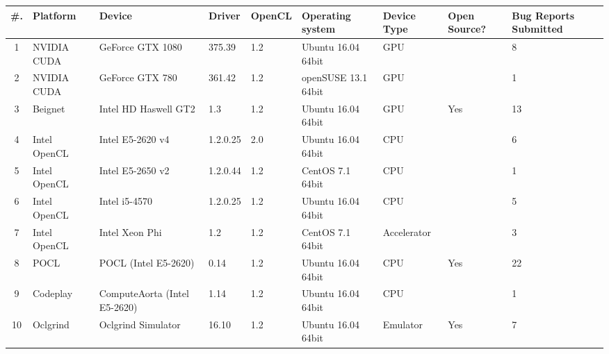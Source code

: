 \begin{tabular}{ cllllllR{1cm} | R{1.6cm} }
\toprule
\textbf{\#. } & \textbf{Platform} & \textbf{Device} & \textbf{Driver} & \textbf{OpenCL} & 
\textbf{Operating system} & \textbf{Device Type} & \textbf{Open Source?} & \textbf{Bug Reports Submitted} \\
 & NVIDIA CUDA & GeForce GTX 1080 & 375.39 & 1.2 & Ubuntu 16.04 64bit & GPU &  & 8 \\
2 & NVIDIA CUDA & GeForce GTX 780 & 361.42 & 1.2 & openSUSE  13.1 64bit & GPU &  &  1 \\
3 & Beignet & Intel HD Haswell GT2 & 1.3 & 1.2 & Ubuntu 16.04 64bit & GPU & Yes &  13 \\
4 & Intel OpenCL & Intel E5-2620 v4 & 1.2.0.25 & 2.0 & Ubuntu 16.04 64bit & CPU &  & 6 \\
5 & Intel OpenCL & Intel E5-2650 v2 & 1.2.0.44 & 1.2 & CentOS 7.1 64bit & CPU &  & 1 \\
6 & Intel OpenCL & Intel i5-4570 & 1.2.0.25 & 1.2 & Ubuntu 16.04 64bit & CPU &  & 5 \\
7 & Intel OpenCL & Intel Xeon Phi & 1.2 & 1.2 & CentOS 7.1 64bit & Accelerator &  & 3 \\
8 & POCL & POCL (Intel E5-2620) & 0.14 & 1.2 & Ubuntu 16.04 64bit & CPU & Yes & 22 \\
9 & Codeplay & ComputeAorta (Intel E5-2620) & 1.14 & 1.2 & Ubuntu 16.04 64bit & CPU &  & 1 \\
10 & Oclgrind & Oclgrind Simulator & 16.10 & 1.2 & Ubuntu 16.04 64bit & Emulator & Yes & 7 \\

\bottomrule
\end{tabular}


